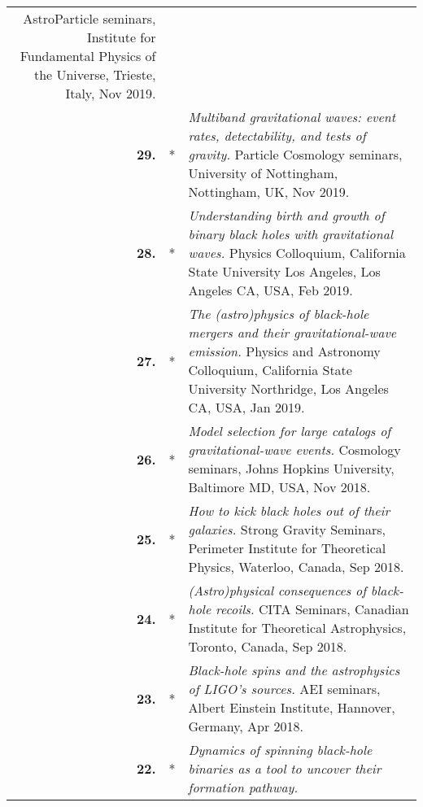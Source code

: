 {\begin{longtable}{rp{0.3cm}p{15.8cm}}
AstroParticle seminars, Institute for Fundamental Physics of the Universe, Trieste, Italy, Nov 2019.
\vspace{0.05cm}\\
%
\textbf{29.} & * & \textit{Multiband gravitational waves: event rates, detectability, and tests of gravity.}
\newline{}
Particle Cosmology seminars, University of Nottingham, Nottingham, UK, Nov 2019.
\vspace{0.05cm}\\
%
\textbf{28.} & * & \textit{Understanding birth and growth of binary black holes with gravitational waves.}
\newline{}
Physics Colloquium, California State University Los Angeles, Los Angeles CA, USA, Feb 2019.
\vspace{0.05cm}\\
%
\textbf{27.} & * & \textit{The (astro)physics of black-hole mergers and their gravitational-wave emission.}
\newline{}
Physics and Astronomy Colloquium, California State University Northridge, Los Angeles CA, USA, Jan 2019.
\vspace{0.05cm}\\
%
\textbf{26.} & * & \textit{Model selection for large catalogs of gravitational-wave events.}
\newline{}
Cosmology seminars, Johns Hopkins University, Baltimore MD, USA, Nov 2018.
\vspace{0.05cm}\\
%
\textbf{25.} & * & \textit{How to kick black holes out of their galaxies.}
\newline{}
Strong Gravity Seminars, Perimeter Institute for Theoretical Physics, Waterloo, Canada, Sep 2018.
\vspace{0.05cm}\\
%
\textbf{24.} & * & \textit{(Astro)physical consequences of black-hole recoils.}
\newline{}
CITA Seminars, Canadian Institute for Theoretical Astrophysics, Toronto, Canada, Sep 2018.
\vspace{0.05cm}\\
%
\textbf{23.} & * & \textit{Black-hole spins and the astrophysics of LIGO's sources.}
\newline{}
AEI seminars, Albert Einstein Institute, Hannover, Germany, Apr 2018.
\vspace{0.05cm}\\
%
\textbf{22.} & * & \textit{Dynamics of spinning black-hole binaries as a tool to uncover their formation pathway.}

\end{longtable}}
